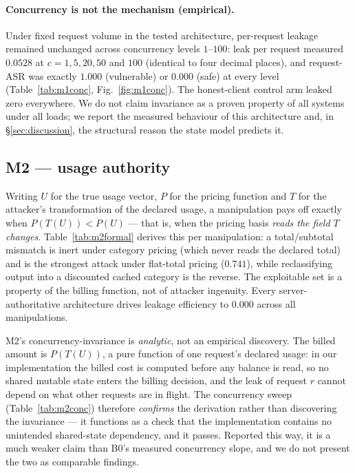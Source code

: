 \documentclass[11pt]{article}
\begin{document}
\paragraph{Concurrency is not the mechanism (empirical).} Under fixed request volume in
the tested architecture, per-request leakage remained unchanged across concurrency levels
$1$--$100$: leak per request measured $0.0528$ at $c=1,5,20,50$ and $100$ (identical to
four decimal places), and request-ASR was exactly $1.000$ (vulnerable) or $0.000$ (safe)
at every level (Table~\ref{tab:m1conc}, Fig.~\ref{fig:m1conc}). The honest-client control
arm leaked zero everywhere. We do not claim invariance as a proven property of all
systems under all loads; we report the measured behaviour of this architecture and, in
\S\ref{sec:discussion}, the structural reason the state model predicts it.

\subsection{M2 --- usage authority}
Writing $U$ for the true usage vector, $P$ for the pricing function and $T$ for the
attacker's transformation of the declared usage, a manipulation pays off exactly when
$P(T(U))<P(U)$ --- that is, when the pricing basis \emph{reads the field $T$ changes}.
Table~\ref{tab:m2formal} derives this per manipulation: a total/subtotal mismatch is inert
under category pricing (which never reads the declared total) and is the strongest attack
under flat-total pricing ($0.741$), while reclassifying output into a discounted cached
category is the reverse. The exploitable set is a property of the billing function, not of
attacker ingenuity. Every server-authoritative architecture drives leakage efficiency to
$0.000$ across all manipulations.

M2's concurrency-invariance is \emph{analytic}, not an empirical discovery. The billed
amount is $P(T(U))$, a pure function of one request's declared usage: in our
implementation the billed cost is computed before any balance is read, so no shared
mutable state enters the billing decision, and the leak of request $r$ cannot depend on
what other requests are in flight. The concurrency sweep (Table~\ref{tab:m2conc})
therefore \emph{confirms} the derivation rather than discovering the invariance --- it
functions as a check that the implementation contains no unintended shared-state
dependency, and it passes. Reported this way, it is a much weaker claim than B0's
measured concurrency slope, and we do not present the two as comparable findings.
\end{document}
